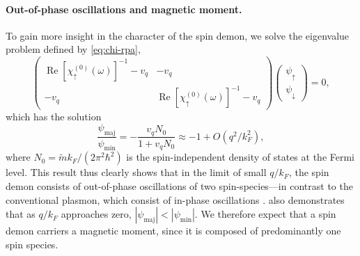 \documentclass[aps,prl,reprint,twocolumns,superscriptaddress]{revtex4-2}
\DeclareMathOperator{\Ree}{Re}
\newcommand{\mdos}{\tilde{m}}
\newcommand{\kF}{k_{F}}
\begin{document}
	\paragraph{Out-of-phase oscillations and magnetic moment. }To gain more insight in the character of the spin demon, we solve the eigenvalue problem defined by \cref{eq:chi-rpa}, 
	\begin{equation}
		\begin{pmatrix}
			\Ree[\chi_{\uparrow}^{(0)}(\omega)]^{-1}-v_q & -v_q \\
			-v_q & \Ree[\chi_{\uparrow}^{(0)}(\omega)]^{-1}-v_q
		\end{pmatrix}\begin{pmatrix}
			\psi_\uparrow \\ \psi_\downarrow
		\end{pmatrix} =0,
	\end{equation}
	which has the solution
	\begin{equation}
		\frac{\psi_{{\mathrm{maj}}}}{\psi_{{\mathrm{min}}}} = -\frac{v_qN_0}{1 + v_qN_0}\approx -1 + O(q^2/\kF^2) \label{eq:out-of-phase},
	\end{equation} 
	where $N_0=\mdos \kF / (2\pi^2\hbar^2)$ is the spin-independent density of states at the Fermi level.
	This result thus clearly shows that in the limit of small $q/\kF$, the spin demon consists of out-of-phase oscillations of two spin-species---in contrast to the conventional plasmon, which consist of in-phase oscillations \cite{agarwalLonglivedSpinPlasmons2014}.  also demonstrates that as $q/\kF$ approaches zero, $|{\psi_{{\mathrm{maj}}}}| < |{\psi_{{\mathrm{min}}}}|$. We therefore expect that a spin demon carriers a magnetic moment, since it is composed of predominantly one spin species. 
	
\end{document}
